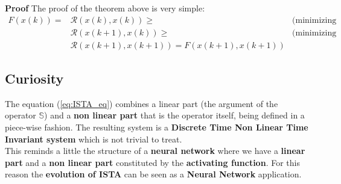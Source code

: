 \textbf{Proof} The proof of the theorem above is very simple:
\begin{align*}
    F(x(k))=&\mathcal{R}(x(k), x(k))  \ge \quad &\text{(minimizing over x)} \\
    &\mathcal{R}(x(k+1), x(k))  \ge \quad &\text{(minimizing over b)}\\
    &\mathcal{R}(x(k+1), x(k+1)) = F(x(k+1),x(k+1))
\end{align*}

\hspace*{-5mm}

\subsection{Curiosity}
The equation (\ref{eq:ISTA_eq}) combines a linear part (the argument of the operator $\mathbb{S}$) and a \textbf{non linear part} that is the operator itself, being defined in a piece-wise fashion. The resulting system is a \textbf{Discrete Time Non Linear Time Invariant system} which is not trivial to treat.\\
This reminds a little the structure of a \textbf{neural network} where we have a \textbf{linear part} and a \textbf{non linear part} constituted by the \textbf{activating function}. For this reason the \textbf{evolution of ISTA} can be seen as a \textbf{Neural Network} application.

